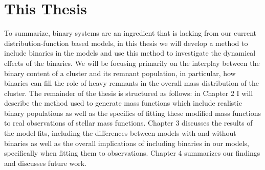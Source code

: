 \section{This Thesis}
To summarize, binary systems are an ingredient that is lacking from our current
distribution-function based models, in this thesis we will develop a method to include binaries in
the  models and use this method to investigate the dynamical effects of the binaries.
We will be focusing primarily on the interplay between the binary content of a cluster and its
remnant population, in particular, how binaries can fill the role of heavy remnants in the overall
mass distribution of the cluster. The remainder of the thesis is structured as follows: in Chapter 2
I will describe the method used to generate mass functions which include realistic binary
populations as well as the specifics of fitting these modified mass functions to real observations
of stellar mass functions. Chapter 3 discusses the results of the model fits, including the
differences between models with and without binaries as well as the overall implications of
including binaries in our models, specifically when fitting them to observations. Chapter 4
summarizes our findings and discusses future work.




